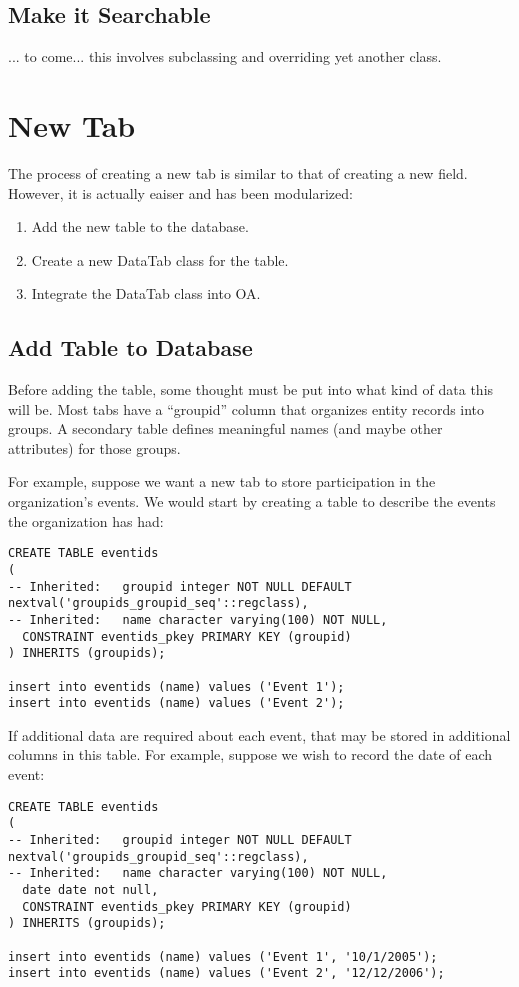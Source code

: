 \documentclass[11pt]{article}
\begin{document}
\subsection{Make it Searchable}

... to come... this involves subclassing and overriding yet another class.

\section{New Tab}

The process of creating a new tab is similar to that of creating a new field.  However, it is actually eaiser and has been modularized:
 \begin{enumerate}
 \item Add the new table to the database.
 \item Create a new DataTab class for the table.
 \item Integrate the DataTab class into OA.
 \end{enumerate}

\subsection{Add Table to Database}

Before adding the table, some thought must be put into what kind of data this will be.  Most tabs have a ``groupid'' column that organizes entity records into groups.  A secondary table defines meaningful names (and maybe other attributes) for those groups.

For example, suppose we want a new tab to store participation in the organization's events.  We would start by creating a table to describe the events the organization has had:
\begin{verbatim}
CREATE TABLE eventids
(
-- Inherited:   groupid integer NOT NULL DEFAULT nextval('groupids_groupid_seq'::regclass),
-- Inherited:   name character varying(100) NOT NULL,
  CONSTRAINT eventids_pkey PRIMARY KEY (groupid)
) INHERITS (groupids);

insert into eventids (name) values ('Event 1');
insert into eventids (name) values ('Event 2');
\end{verbatim}

If additional data are required about each event, that may be stored in additional columns in this table.  For example, suppose we wish to record the date of each event:

\begin{verbatim}
CREATE TABLE eventids
(
-- Inherited:   groupid integer NOT NULL DEFAULT nextval('groupids_groupid_seq'::regclass),
-- Inherited:   name character varying(100) NOT NULL,
  date date not null,
  CONSTRAINT eventids_pkey PRIMARY KEY (groupid)
) INHERITS (groupids);

insert into eventids (name) values ('Event 1', '10/1/2005');
insert into eventids (name) values ('Event 2', '12/12/2006');
\end{verbatim}
\end{document}
